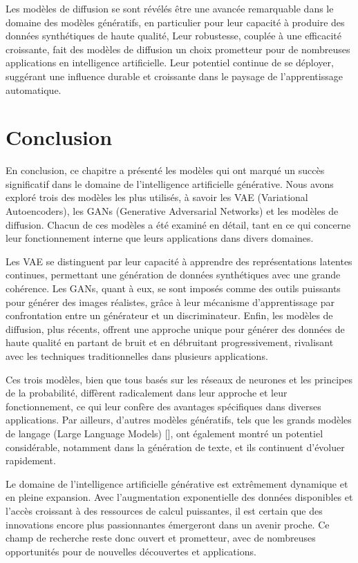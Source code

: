 Les modèles de diffusion se sont révélés être une avancée remarquable dans le
domaine des modèles génératifs, en particulier pour leur capacité à produire
des données synthétiques de haute qualité, Leur robustesse, couplée à une
efficacité croissante, fait des modèles de diffusion un choix prometteur pour
de nombreuses applications en intelligence artificielle. Leur potentiel
continue de se déployer, suggérant une influence durable et croissante dans le
paysage de l'apprentissage automatique.

\section{Conclusion}
En conclusion, ce chapitre a présenté les modèles qui ont marqué un succès
significatif dans le domaine de l'intelligence artificielle générative. Nous
avons exploré trois des modèles les plus utilisés, à savoir les VAE
(Variational Autoencoders), les GANs (Generative Adversarial Networks) et les
modèles de diffusion. Chacun de ces modèles a été examiné en détail, tant en ce
qui concerne leur fonctionnement interne que leurs applications dans divers
domaines.

Les VAE se distinguent par leur capacité à apprendre des représentations
latentes continues, permettant une génération de données synthétiques avec une
grande cohérence. Les GANs, quant à eux, se sont imposés comme des outils
puissants pour générer des images réalistes, grâce à leur mécanisme
d'apprentissage par confrontation entre un générateur et un discriminateur.
Enfin, les modèles de diffusion, plus récents, offrent une approche unique pour
générer des données de haute qualité en partant de bruit et en débruitant
progressivement, rivalisant avec les techniques traditionnelles dans plusieurs
applications.

Ces trois modèles, bien que tous basés sur les réseaux de neurones et les
principes de la probabilité, diffèrent radicalement dans leur approche et leur
fonctionnement, ce qui leur confère des avantages spécifiques dans diverses
applications. Par ailleurs, d'autres modèles génératifs, tels que les grands
modèles de langage (Large Language Models) [\cite{attention_is_all_you_need}],
ont également montré un potentiel considérable, notamment dans la génération de
texte, et ils continuent d'évoluer rapidement.

Le domaine de l'intelligence artificielle générative est extrêmement dynamique
et en pleine expansion. Avec l'augmentation exponentielle des données
disponibles et l'accès croissant à des ressources de calcul puissantes, il est
certain que des innovations encore plus passionnantes émergeront dans un avenir
proche. Ce champ de recherche reste donc ouvert et prometteur, avec de
nombreuses opportunités pour de nouvelles découvertes et applications.

